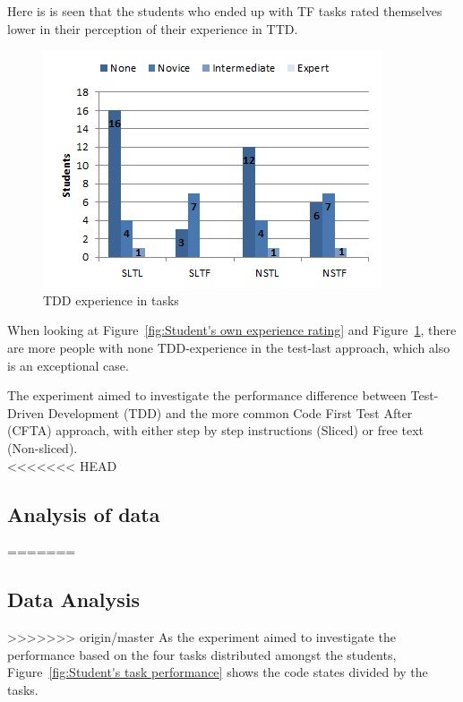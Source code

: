 \documentclass{sig-alternate-05-2015}
\begin{document}
Here is is seen that the students who ended up with TF tasks rated themselves lower in their perception of their experience in TTD.

\begin{figure}[!ht]
	\centering
	\includegraphics[width=1\linewidth]{img04}
	\caption{TDD experience in tasks}
	\label{fig:TDD experience in tasks}
\end{figure}

When looking at Figure~\ref{fig:Student's own experience rating} and Figure~\ref{fig:TDD experience in tasks}, there are more people with none TDD-experience in the test-last approach, which also is an exceptional case.

The experiment aimed to investigate the performance difference between Test-Driven Development (TDD) and the more common Code First Test After (CFTA) approach, with either step by step instructions (Sliced) or free text (Non-sliced).\\

<<<<<<< HEAD
\subsection{Analysis of data} %
\label{DataAnalysis}
=======
\subsection{Data Analysis} %
>>>>>>> origin/master
As the experiment aimed to investigate the performance based on the four tasks distributed amongst the students, Figure~\ref{fig:Student's task performance} shows the code states divided by the tasks.
\end{document}
